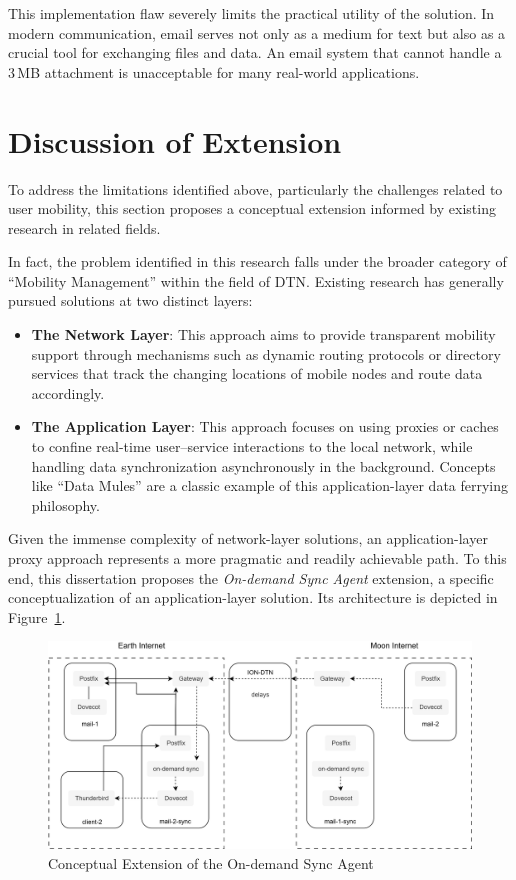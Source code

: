 This implementation flaw severely limits the practical utility of the solution.  
In modern communication, email serves not only as a medium for text but also as a crucial tool for exchanging files and data.  
An email system that cannot handle a 3\,MB attachment is unacceptable for many real-world applications.



\section{Discussion of Extension}

To address the limitations identified above, particularly the challenges related to user mobility, this section proposes a conceptual extension informed by existing research in related fields.

In fact, the problem identified in this research falls under the broader category of ``Mobility Management'' within the field of DTN.  
Existing research has generally pursued solutions at two distinct layers:

\begin{itemize}
    \item \textbf{The Network Layer}: This approach aims to provide transparent mobility support through mechanisms such as dynamic routing protocols or directory services that track the changing locations of mobile nodes and route data accordingly.
    \item \textbf{The Application Layer}: This approach focuses on using proxies or caches to confine real-time user--service interactions to the local network, while handling data synchronization asynchronously in the background. Concepts like ``Data Mules'' are a classic example of this application-layer data ferrying philosophy.
\end{itemize}

Given the immense complexity of network-layer solutions, an application-layer proxy approach represents a more pragmatic and readily achievable path.
To this end, this dissertation proposes the \textit{On-demand Sync Agent} extension, a specific conceptualization of an application-layer solution.  
Its architecture is depicted in Figure~\ref{fig:sync_agent}.

\begin{figure}[ht]
      \centering
      \includegraphics[width=1.0\textwidth]{Results/sync_agent.png}
      \caption{Conceptual Extension of the On-demand Sync Agent}
      \label{fig:sync_agent}
\end{figure}

